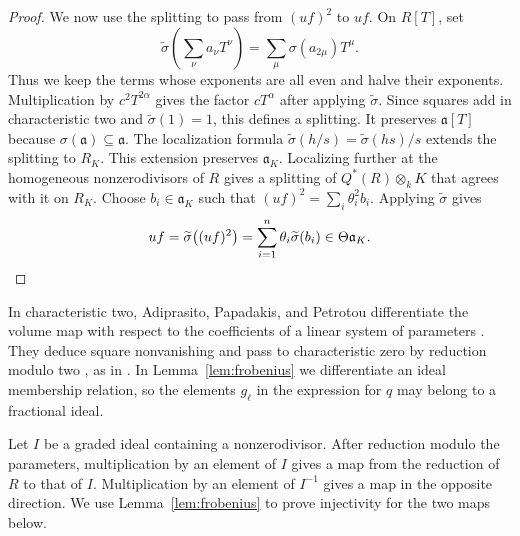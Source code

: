 \documentclass[a4paper,11pt]{amsart}
\newcommand{\kk}{k}
\theoremstyle{definition}
\begin{document}
\begin{proof}
We now use the splitting to pass from $(uf)^2$ to $uf$. On $R[T]$, set
\[
 \widetilde\sigma\!\left(\sum_{\nu}a_{\nu}T^{\nu}\right)=\sum_{\mu}\sigma(a_{2\mu})T^\mu.
\]
Thus we keep the terms whose exponents are all even and halve their exponents. Multiplication by $c^2T^{2\alpha}$ gives the factor $cT^\alpha$ after applying $\widetilde\sigma$. Since squares add in characteristic two and $\widetilde\sigma(1)=1$, this defines a splitting. It preserves $\mathfrak a[T]$ because $\sigma(\mathfrak a)\subseteq\mathfrak a$. The localization formula $\widetilde\sigma(h/s)=\widetilde\sigma(hs)/s$ extends the splitting to $R_K$. This extension preserves $\mathfrak a_K$. Localizing further at the homogeneous nonzerodivisors of $R$ gives a splitting of $Q^*(R)\otimes_{\kk}K$ that agrees with it on $R_K$. Choose $b_i\in\mathfrak a_K$ such that $(uf)^2=\sum_i\theta_i^2 b_i$. Applying $\widetilde\sigma$ gives
\[
 uf=\widetilde\sigma\bigl((uf)^2\bigr)=\sum_{i=1}^n\theta_i\widetilde\sigma(b_i)\in\Theta \mathfrak a_K.\qedhere
\]
\end{proof}

In characteristic two, Adiprasito, Papadakis, and Petrotou differentiate the volume map with respect to the coefficients of a linear system of parameters \cite[Lemma~5.1]{APP25}. They deduce square nonvanishing and pass to characteristic zero by reduction modulo two \cite[Theorems~3.3 and~6.5]{APP25}, as in \cite[Section~3.2]{KLS26}. In Lemma~\ref{lem:frobenius} we differentiate an ideal membership relation, so the elements $g_\ell$ in the expression for $q$ may belong to a fractional ideal.

Let $I$ be a graded ideal containing a nonzerodivisor. After reduction modulo the parameters, multiplication by an element of $I$ gives a map from the reduction of $R$ to that of $I$. Multiplication by an element of $I^{-1}$ gives a map in the opposite direction. We use Lemma~\ref{lem:frobenius} to prove injectivity for the two maps below.
\end{document}
